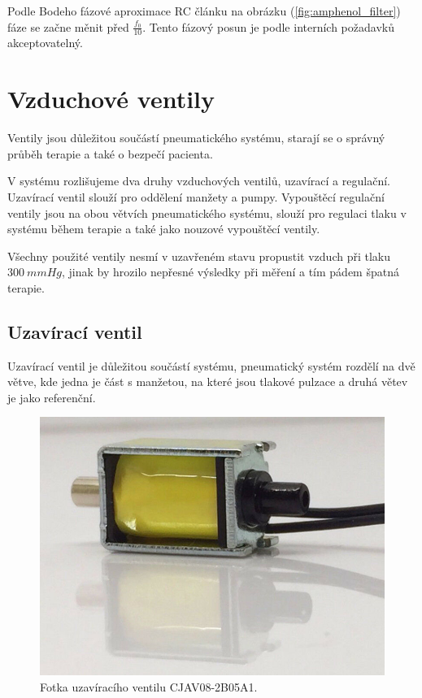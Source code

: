 Podle Bodeho fázové aproximace RC článku na obrázku (\ref{fig:amphenol_filter}) fáze se začne měnit před $\frac{f_0}{10}$. Tento fázový posun je podle interních požadavků akceptovatelný.
\section{Vzduchové ventily}
Ventily jsou důležitou součástí pneumatického systému, starají se o správný průběh terapie a také o bezpečí pacienta. \par
V systému rozlišujeme dva druhy vzduchových ventilů, uzavírací a regulační. Uzavírací ventil slouží pro oddělení manžety a pumpy. Vypouštěcí regulační ventily jsou na obou větvích pneumatického systému, slouží pro regulaci tlaku v systému během terapie a také jako nouzové vypouštěcí ventily. \par
Všechny použité ventily nesmí v uzavřeném stavu propustit vzduch při tlaku $300 \ mmHg$, jinak by hrozilo nepřesné výsledky při měření a tím pádem špatná terapie.
\pagebreak
\subsection{Uzavírací ventil}
Uzavírací ventil je důležitou součástí systému, pneumatický systém rozdělí na dvě větve, kde jedna je část s manžetou, na které jsou tlakové pulzace a druhá větev je jako referenční. \par

\begin{figure}[H]
    \includegraphics[width=0.9\linewidth]{pictures/closing_valve.jpg}
    \caption{Fotka uzavíracího ventilu CJAV08-2B05A1. \cite{cite:UzaviraciVentil}}
    \label{fig:closing_valve}
\end{figure}

